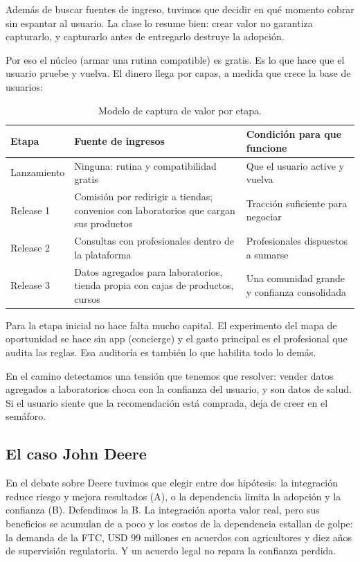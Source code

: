 \documentclass[11pt,a4paper]{article}
\begin{document}
Además de buscar fuentes de ingreso, tuvimos que decidir en qué momento cobrar sin espantar al usuario. La clase lo resume bien: crear valor no garantiza capturarlo, y capturarlo antes de entregarlo destruye la adopción.

Por eso el núcleo (armar una rutina compatible) es gratis. Es lo que hace que el usuario pruebe y vuelva. El dinero llega por capas, a medida que crece la base de usuarios:

\begin{table}[h]
\centering
\small
\begin{tabularx}{\linewidth}{@{}p{2cm}LL@{}}
\toprule
\textbf{Etapa} & \textbf{Fuente de ingresos} & \textbf{Condición para que funcione} \\
\midrule
Lanzamiento & Ninguna: rutina y compatibilidad gratis & Que el usuario active y vuelva \\
Release 1 & Comisión por redirigir a tiendas; convenios con laboratorios que cargan sus productos & Tracción suficiente para negociar \\
Release 2 & Consultas con profesionales dentro de la plataforma & Profesionales dispuestos a sumarse \\
Release 3 & Datos agregados para laboratorios, tienda propia con cajas de productos, cursos & Una comunidad grande y confianza consolidada \\
\bottomrule
\end{tabularx}
\caption{Modelo de captura de valor por etapa.}
\end{table}

Para la etapa inicial no hace falta mucho capital. El experimento del mapa de oportunidad se hace sin app (concierge) y el gasto principal es el profesional que audita las reglas. Esa auditoría es también lo que habilita todo lo demás.

En el camino detectamos una tensión que tenemos que resolver: vender datos agregados a laboratorios choca con la confianza del usuario, y son datos de salud. Si el usuario siente que la recomendación está comprada, deja de creer en el semáforo.

\subsection{El caso John Deere}

En el debate sobre Deere tuvimos que elegir entre dos hipótesis: la integración reduce riesgo y mejora resultados (A), o la dependencia limita la adopción y la confianza (B). Defendimos la B. La integración aporta valor real, pero sus beneficios se acumulan de a poco y los costos de la dependencia estallan de golpe: la demanda de la FTC, USD 99 millones en acuerdos con agricultores y diez años de supervisión regulatoria. Y un acuerdo legal no repara la confianza perdida.
\end{document}
